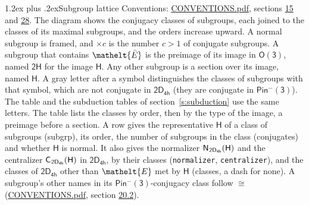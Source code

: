 \documentclass[10pt,a4paper]{article}
\makeatletter
\renewcommand\section{\@startsection{section}{1}{\z@}{-3ex plus -1ex minus -.2ex}%
  {1.2ex plus .2ex}{\normalfont\large\sffamily\bfseries\color{parttitle}}}
\numberwithin{equation}{section}
\newcommand{\eltfont}[1]{{\let\sigma\eltsigma\mathelt{#1}}}
\newcommand{\grp}[1]{\mathsf{#1}}
\newcommand{\cls}[1]{\eltfont{#1}}
\newcommand{\elt}[1]{\eltfont{#1}}
\newcommand{\samecls}{\cong}
\newcommand{\barred}[1]{\bar{#1}}
\newcommand{\hairsp}{\mkern1mu}
\makeatother
\begin{document}
\section{Subgroup lattice}\label{s:subgroups}
Conventions: \href{../../CONVENTIONS.pdf}{CONVENTIONS.pdf}, sections \href{../../../rotation/CONVENTIONS.pdf\#conv.15}{15} and \href{../../CONVENTIONS.pdf\#conv.28}{28}.
The diagram shows the conjugacy classes of subgroups, each joined to the classes of its maximal subgroups, and the orders increase upward. \label{n:index.conjugates.c}\label{n:mark.conjugates}A normal subgroup is framed, and ${\times}c$ is the number $c > 1$ of conjugate subgroups. \label{n:group.H}A subgroup that contains $\elt{\barred{E}}$ is the preimage of its image in $\grp{O(3)}$, named $\grp{2H}$ for the image $\grp{H}$. Any other subgroup is a section over its image, named $\grp{H}$. A gray letter after a symbol distinguishes the classes of subgroups with that symbol, which are not conjugate in $\grp{2D_{4h}}$ (they are conjugate in \href{Pinminus3.pdf}{$\grp{Pin^{-}(3)}$}). The table and the subduction tables of section~\ref{s:subduction} use the same letters. The table lists the classes by order, then by the type of the image, a preimage before a section. \label{n:head.subgroup}\label{n:head.order}\label{n:head.conjugates}\label{n:head.normal}A row gives the representative $\grp{H}$ of a class of subgroups (subgrp), its order, the number of subgroups in the class (conjugates) and whether $\grp{H}$ is normal. \label{n:group.normalizer}\label{n:group.centralizer}\label{n:head.classes}It also gives the normalizer $\grp{N}_{\hairsp \grp{2D_{4h}}}(\grp{H})$ and the centralizer $\grp{C}_{\hairsp \grp{2D_{4h}}}(\grp{H})$ in $\grp{2D_{4h}}$, by their classes (\texttt{normalizer}, \texttt{centralizer}), and the classes of $\grp{2D_{4h}}$ other than $\cls{E}$ met by $\grp{H}$ (classes, a dash for none). A subgroup's other names in its \href{Pinminus3.pdf}{$\grp{Pin^{-}(3)}$}-conjugacy class follow $\samecls$ (\href{../../CONVENTIONS.pdf}{CONVENTIONS.pdf}, section \href{../../CONVENTIONS.pdf\#conv.20.2}{20.2}).
\end{document}
